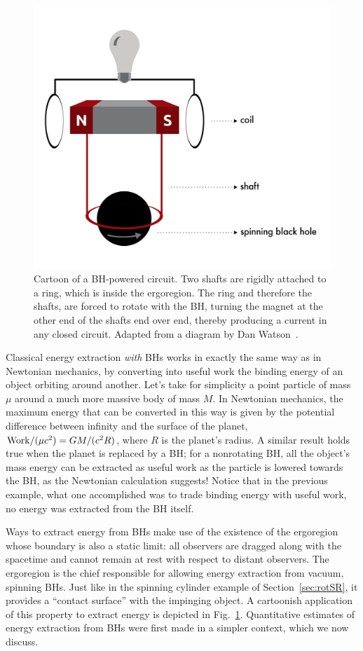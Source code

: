 \documentclass[11pt]{article}
\numberwithin{equation}{section} %
\begin{document}
%
\begin{figure}
\centerline{\includegraphics[height=0.8\textwidth]{spinning_bh_gen_v2.pdf}}
\caption{Cartoon of a BH-powered circuit. Two shafts are rigidly attached to a ring, which is inside the ergoregion. The ring and therefore the shafts, are forced to rotate with the BH, turning the magnet at the other end of the shafts end over end, thereby producing a current in any closed circuit. Adapted from a diagram by Dan Watson~\cite{DanWatson}.} \label{fig:generator}
\end{figure}
%
Classical energy extraction {\it with} BHs works in exactly the same way as in Newtonian mechanics,
by converting into useful work the binding energy of an object orbiting around another. Let's take for simplicity a point particle
of mass $\mu$ around a much more massive body of mass $M$. In Newtonian mechanics, the maximum energy that can be converted in this way
is given by the potential difference between infinity and the surface of the planet, ${\rm Work}/(\mu c^2)=GM/(c^2R)$, where $R$ is the planet's radius. A similar result holds true when the planet is replaced by a BH; for a nonrotating BH, all the object's mass energy can be extracted as useful work as the particle is lowered towards the BH, as the Newtonian calculation suggests!
Notice that in the previous example, what one accomplished was to trade binding energy with useful work, no energy was extracted from the BH itself.


Ways to extract energy from BHs make use of the existence of the ergoregion whose boundary is also a static limit:
all observers are dragged along with the spacetime and cannot remain at rest with respect to distant observers.
The ergoregion is the chief responsible for allowing energy extraction from vacuum, spinning BHs. Just like in 
the spinning cylinder example of Section~\ref{sec:rotSR}, it provides a ``contact surface'' with the impinging object.
A cartoonish application of this property to extract energy is depicted in Fig.~\ref{fig:generator}. 
Quantitative estimates of energy extraction from BHs were first made in a simpler context, which we now discuss.
\end{document}
